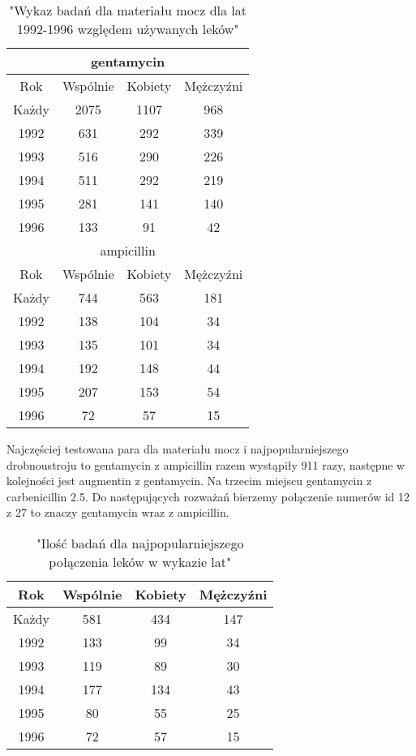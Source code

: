 \documentclass[a4paper,11pt]{article}
\begin{document}
\begin{table}[h]
  \begin{center}
  \caption{"Wykaz badań dla materiału mocz dla lat 1992-1996 względem używanych leków"}
  \begin{tabular}{|c|c|c|c|}
    \hline
    \multicolumn{4}{|c|}{gentamycin} \\ 
    \hline Rok &Wspólnie & Kobiety & Mężczyźni \\ \hline
Każdy& 2075& 1107& 968 \\ \hline 
1992& 631& 292& 339 \\ \hline
1993& 516& 290& 226 \\ \hline
1994& 511& 292& 219 \\ \hline
1995& 281& 141& 140 \\ \hline
1996& 133& 91& 42 \\ \hline
\multicolumn{4}{|c|}{ampicillin} \\ 
\hline Rok &Wspólnie & Kobiety & Mężczyźni \\ \hline
Każdy& 744& 563& 181 \\ \hline 
1992& 138& 104& 34 \\ \hline
1993& 135& 101& 34 \\ \hline
1994& 192& 148& 44 \\ \hline
1995& 207& 153& 54 \\ \hline
1996& 72& 57& 15 \\ \hline
  \end{tabular}
\end{center}
\end{table}

Najczęściej testowana para dla materiału mocz i najpopularniejszego drobnoustroju to gentamycin z ampicillin razem wystąpiły 911 razy,
 następne w kolejności jest augmentin z gentamycin. Na trzecim miejscu gentamycin z carbenicillin 2.5.
Do następujących rozważań bierzemy połączenie numerów id 12 z 27 to znaczy gentamycin wraz z ampicillin.


\begin{table}[h]
  \begin{center}
  \caption{"Ilość badań dla najpopularniejszego połączenia leków w wykazie lat"}
  \begin{tabular}{|c|c|c|c|}
\hline Rok &Wspólnie & Kobiety & Mężczyźni \\ \hline
Każdy& 581& 434& 147 \\ \hline 
1992& 133& 99& 34 \\ \hline
1993& 119& 89& 30 \\ \hline
1994& 177& 134& 43 \\ \hline
1995& 80& 55& 25 \\ \hline
1996& 72& 57& 15 \\ \hline

  \end{tabular}
\end{center}
\end{table}
\end{document}
